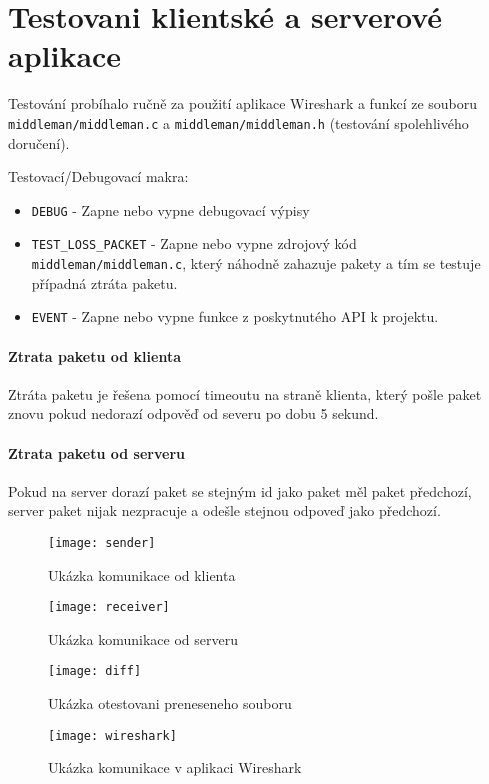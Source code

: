 

\section{Testovani klientské a serverové aplikace}\label{sec:testovani}
Testování probíhalo ručně za použití aplikace Wireshark a funkcí
ze souboru \texttt{middleman/middleman.c} a \texttt{middleman/middleman.h}
(testování spolehlivého doručení).

Testovací/Debugovací makra:
\begin{itemize}
    \item \texttt{DEBUG} - Zapne nebo vypne debugovací výpisy
    \item \texttt{TEST\_LOSS\_PACKET} - Zapne nebo vypne zdrojový kód
    \texttt{middleman/middleman.c}, který náhodně zahazuje pakety
    a tím se testuje případná ztráta paketu.
    \item \texttt{EVENT} - Zapne nebo vypne funkce z poskytnutého API k projektu.
\end{itemize}

\paragraph{Ztrata paketu od klienta}
Ztráta paketu je řešena pomocí timeoutu na straně klienta, který pošle
paket znovu pokud nedorazí odpověď od severu po dobu 5 sekund.

\paragraph{Ztrata paketu od serveru}
Pokud na server dorazí paket se stejným id jako paket měl
paket předchozí, server
paket nijak nezpracuje a odešle stejnou odpoveď jako předchozí.

\begin{figure}[H]
    \centering
    \texttt{[image: sender]}
    \caption{Ukázka komunikace od klienta}
    \label{fig:a1}
\end{figure}

\begin{figure}[H]
    \centering
    \texttt{[image: receiver]}
    \caption{Ukázka komunikace od serveru}
    \label{fig:a2}
\end{figure}

\begin{figure}[H]
    \centering
    \texttt{[image: diff]}
    \caption{Ukázka otestovani preneseneho souboru}
    \label{fig:a4}
\end{figure}

\begin{figure}[H]
    \centering
    \texttt{[image: wireshark]}
    \caption{Ukázka komunikace v aplikaci Wireshark}
    \label{fig:a5}
\end{figure}
